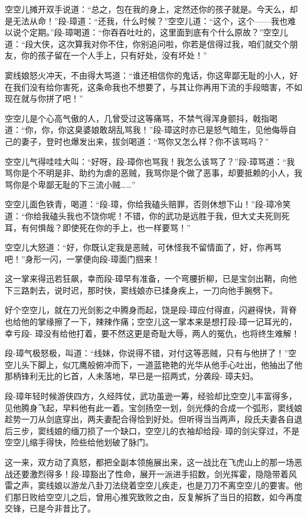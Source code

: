 \documentclass[12pt,oneside]{book}
\begin{document}
空空儿摊开双手说道：``总之，包在我的身上，定然还你的孩子就是。今天么，却是无法从命！''段-璋道：``还我，什么时候？''空空儿道：``这个，这个------我也难以说个定期。''段-璋喝道：``你吞吞吐吐的，这里面到底有个什么原故？''空空儿道：``段大侠，这次算我对你不住，你别追问啦，你若是信得过我，咱们就交个朋友，你的孩子留在一个人手上，只有好处，没有坏处！''

窦线娘怒火冲天，不由得大骂道：``谁还相信你的鬼话，你这卑鄙无耻的小人，好在我们没有给你害死，这条命我也不想要了，与其让你再用下流的手段暗害，不如现在就与你拼了吧！''

空空儿是个心高气傲的人，几曾受过这等痛骂，不禁气得浑身颤抖，戟指喝道：``你，你，你这臭婆娘敢胡乱骂我！''段-璋这时亦已是怒气暗生，见他侮辱自己的妻子，登时也爆发出来，拔剑喝道：``骂你又怎么样？你不该骂吗？''

空空儿气得哇哇大叫：``好呀，段-璋你也骂我！我怎么该骂了？''段-璋骂道：``我骂你是个不明是非、助约为虐的恶贼，我骂你是个做了恶事，却要抵赖的小人，我骂你是个卑鄙无耻的下三流小贼\ldots\ldots{}''

空空儿面色铁青，喝道：``段-璋，你给我磕头赔罪，否则休想下山！''段-璋冷笑道：``你给我磕头我也不饶你呢！不错，你的武功是远胜于我，但大丈夫死则死耳，有何惧哉？即使死在你的手上，也一样要骂！''

空空儿大怒道：``好，你既认定我是恶贼，可休怪我不留情面了，好，你再骂吧！''身形一闪，一掌便向段-璋面门掴来！

这一掌来得迅若狂飙，幸而段-璋早有准备，一个弯腰折柳，已是宝剑出鞘，向他下三路刺去，说时迟，那时快，窦线娘亦已揉身疾上，一刀向他手腕劈下。

好个空空儿，就在刀光剑影之中腾身而起，饶是段-璋应付得直，闪避得快，背脊也给他的掌缘擦了一下，辣辣作痛；空空儿这一掌本来是想打段-璋一记耳光的，幸亏段-
璋没有给他打着，要不然这更是奇耻大辱，两人的冤仇，也将终生难解！

段-璋气极怒极，叫道：``线妹，你说得不错，对付这等恶贼，只有与他拼了！''空空儿头下脚上，似兀鹰般俯冲而下，一道蓝艳艳的光华从他手心吐出，他抽出了他那柄锋利无比的匕首，人未落地，早已是一招两式，分袭段-
璋夫妇。

段-璋年轻时候游侠四方，久经阵仗，武功虽逊一筹，经验却比空空儿丰富得多，见他腾身飞起，早料他有此一着。宝剑扬空一划，剑光倏的合成一个弧形，窦线娘趁势一刀从剑底穿出，两夫妻配合得恰到好处。但听得当当两声，段氏夫妻各自退后三步，窦线娘的缅刀损了一个缺口，空空儿的衣袖却给段-
璋的剑尖穿过，不是空空儿缩手得快，险些给他划破了脉门。

这一来，双方动了真怒，都把全副本领施展出来，这一战比在飞虎山上的那一场恶战还要激烈得多！段-璋豁出了性命，展开一派进手招数，剑光挥霍，隐隐带着风雷之声，窦线娘以游龙八卦刀法绕着空空儿疾走，也是刀刀不离空空儿的要害。他们那日败给空空儿之后，曾用心推究致败之由，反复解拆了当日的招数，如今再度交锋，已是今非昔比了。
\end{document}
